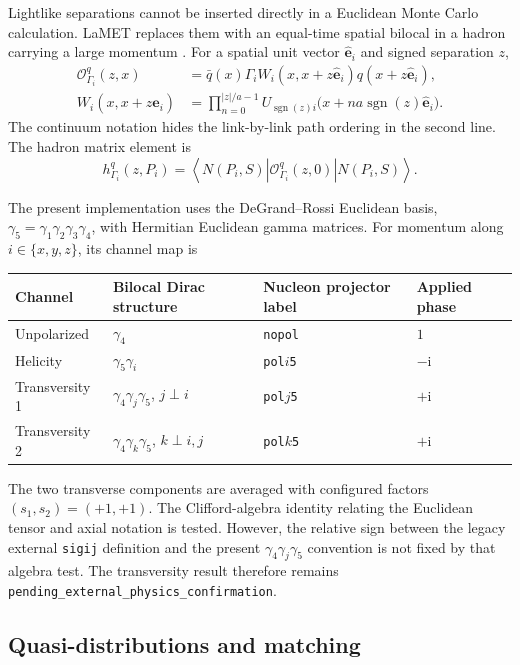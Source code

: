 \documentclass[11pt]{article}
\numberwithin{equation}{section}
\newcommand{\ii}{\mathrm{i}}
\newcommand{\cO}{\mathcal{O}}
\newcommand{\avg}[1]{\left\langle #1\right\rangle}
\begin{document}
Lightlike separations cannot be inserted directly in a Euclidean Monte Carlo
calculation.  LaMET replaces them with an equal-time spatial bilocal in a
hadron carrying a large momentum \cite{Ji2013}.  For a spatial unit vector
$\hat{\bm e}_i$ and signed separation $z$,
\begin{align}
  \cO_{\Gamma_i}^{q}(z,x)
  &=\bar q(x)\Gamma_i
    W_i(x,x+z\hat{\bm e}_i)q(x+z\hat{\bm e}_i),
  \\
  W_i(x,x+z\hat{\bm e}_i)
  &=\prod_{n=0}^{|z|/a-1}
    U_{\operatorname{sgn}(z)i}
    \bigl(x+n a\operatorname{sgn}(z)\hat{\bm e}_i\bigr).
  \label{eq:euclidean-bilocal}
\end{align}
The continuum notation hides the link-by-link path ordering in the second
line.  The hadron matrix element is
\begin{equation}
  h_{\Gamma_i}^q(z,P_i)
  =\avg{N(P_i,S)|\cO_{\Gamma_i}^q(z,0)|N(P_i,S)}.
  \label{eq:coordinate-me}
\end{equation}

The present implementation uses the DeGrand--Rossi Euclidean basis,
$\gamma_5=\gamma_1\gamma_2\gamma_3\gamma_4$, with Hermitian Euclidean gamma
matrices.  For momentum along $i\in\{x,y,z\}$, its channel map is
\begin{center}
\begin{tabular}{llll}
\toprule
Channel & Bilocal Dirac structure & Nucleon projector label & Applied phase\\
\midrule
Unpolarized & $\gamma_4$ & \texttt{nopol} & $1$\\
Helicity & $\gamma_5\gamma_i$ & \texttt{pol}$i$\texttt{5} & $-\ii$\\
Transversity 1 & $\gamma_4\gamma_j\gamma_5$, $j\perp i$ & \texttt{pol}$j$\texttt{5} & $+\ii$\\
Transversity 2 & $\gamma_4\gamma_k\gamma_5$, $k\perp i,j$ & \texttt{pol}$k$\texttt{5} & $+\ii$\\
\bottomrule
\end{tabular}
\end{center}
The two transverse components are averaged with configured factors
$(s_1,s_2)=(+1,+1)$.  The Clifford-algebra identity relating the Euclidean
tensor and axial notation is tested.  However, the relative sign between the
legacy external \texttt{sigij} definition and the present
$\gamma_4\gamma_j\gamma_5$ convention is not fixed by that algebra test.
The transversity result therefore remains
\texttt{pending\_external\_physics\_confirmation}.

\subsection{Quasi-distributions and matching}
\end{document}
